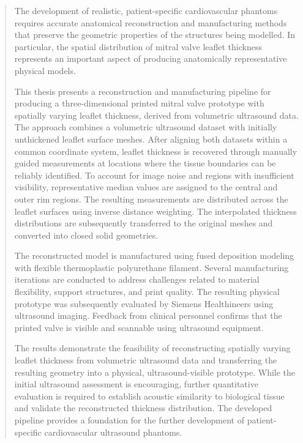 \documentclass[final,twoside]{vutinfth}
\begin{document}
\frontmatter %


\begin{acknowledgements*}
\end{acknowledgements*}

\begin{abstract}
The development of realistic, patient-specific cardiovascular phantoms requires accurate anatomical reconstruction and manufacturing methods that preserve the geometric properties of the structures being modelled. In particular, the spatial distribution of mitral valve leaflet thickness represents an important aspect of producing anatomically representative physical models.

This thesis presents a reconstruction and manufacturing pipeline for producing a three-dimensional printed mitral valve prototype with spatially varying leaflet thickness, derived from volumetric ultrasound data. The approach combines a volumetric ultrasound dataset with initially unthickened leaflet surface meshes. After aligning both datasets within a common coordinate system, leaflet thickness is recovered through manually guided measurements at locations where the tissue boundaries can be reliably identified. To account for image noise and regions with insufficient visibility, representative median values are assigned to the central and outer rim regions. The resulting measurements are distributed across the leaflet surfaces using inverse distance weighting. The interpolated thickness distributions are subsequently transferred to the original meshes and converted into closed solid geometries.

The reconstructed model is manufactured using fused deposition modeling with flexible thermoplastic polyurethane filament. Several manufacturing iterations are conducted to address challenges related to material flexibility, support structures, and print quality. The resulting physical prototype was subsequently evaluated by Siemens Healthineers using ultrasound imaging. Feedback from clinical personnel confirms that the printed valve is visible and scannable using ultrasound equipment.

The results demonstrate the feasibility of reconstructing spatially varying leaflet thickness from volumetric ultrasound data and transferring the resulting geometry into a physical, ultrasound-visible prototype. While the initial ultrasound assessment is encouraging, further quantitative evaluation is required to establish acoustic similarity to biological tissue and validate the reconstructed thickness distribution. The developed pipeline provides a foundation for the further development of patient-specific cardiovascular ultrasound phantoms.

\end{abstract}
\end{document}
